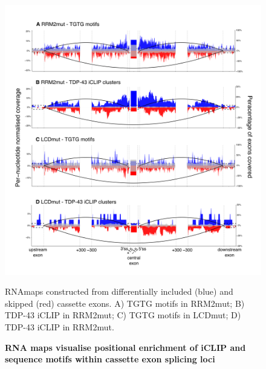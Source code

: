 \begin{figure}[h!]
	\centering
	\includegraphics[width=14cm]{Figures/05_tdp_mice/RNAmap_cassettes.png}
	\caption{\textbf{RNA maps visualise positional enrichment of iCLIP and sequence motifs within cassette exon splicing loci}}
	RNAmaps constructed from differentially included (blue) and skipped (red) cassette exons.  A) TGTG motifs in RRM2mut; B) TDP-43 iCLIP in RRM2mut; C) TGTG motifs in LCDmut; D) TDP-43 iCLIP in RRM2mut.
	
	\label{fig:RNAmap_cassettes}
\end{figure}


